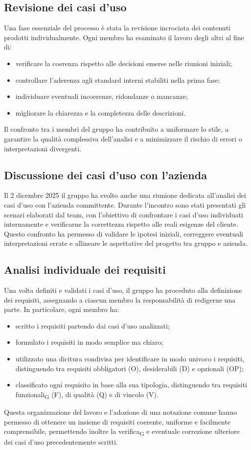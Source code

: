 \documentclass[11pt,a4paper]{article}
\newcommand{\gls}[1]{#1\textsubscript{G}}
\begin{document}
\subsection{Revisione dei casi d'uso}
Una fase essenziale del processo è stata la revisione incrociata dei contenuti prodotti individualmente.
Ogni membro ha esaminato il lavoro degli altri al fine di:
\begin{itemize}
\item verificare la coerenza rispetto alle decisioni emerse nelle riunioni iniziali;
\item controllare l’aderenza agli standard interni stabiliti nella prima fase;
\item individuare eventuali incoerenze, ridondanze o mancanze;
\item migliorare la chiarezza e la completezza delle descrizioni.
\end{itemize}
Il confronto tra i membri del gruppo ha contribuito a uniformare lo stile, a garantire la qualità complessiva dell’analisi e a minimizzare il rischio di errori o interpretazioni divergenti.

\subsection{Discussione dei casi d’uso con l’azienda}
Il 2 dicembre 2025 il gruppo ha svolto anche una riunione dedicata all'analisi dei casi d'uso con l’azienda committente. Durante l’incontro sono stati presentati gli scenari elaborati dal team, con l’obiettivo di confrontare i casi d’uso individuati internamente e verificarne la correttezza rispetto alle reali esigenze del cliente. Questo confronto ha permesso di validare le ipotesi iniziali, correggere eventuali interpretazioni errate e allineare le aspettative del progetto tra gruppo e azienda.

\subsection{Analisi individuale dei requisiti}
Una volta definiti e validati i casi d’uso, il gruppo ha proceduto alla definizione dei requisiti, assegnando a ciascun membro la responsabilità di redigerne una parte. In particolare, ogni membro ha:
\begin{itemize}
\item scritto i requisiti partendo dai casi d’uso analizzati;
\item formulato i requisiti in modo semplice ma chiaro;
\item utilizzato una dicitura condivisa per identificare in modo univoco i requisiti, distinguendo tra requisiti obbligatori (O), desiderabili (D) e opzionali (OP);
\item classificato ogni requisito in base alla sua tipologia, distinguendo tra \gls{requisiti funzionali} (F), di qualità (Q) e di vincolo (V).
\end{itemize}
Questa organizzazione del lavoro e l’adozione di una notazione comune hanno permesso di ottenere un insieme di requisiti coerente, uniforme e facilmente comprensibile, permettendo inoltre la \gls{verifica} e eventuale correzione ulteriore dei casi d’uso precedentemente scritti.
\end{document}
